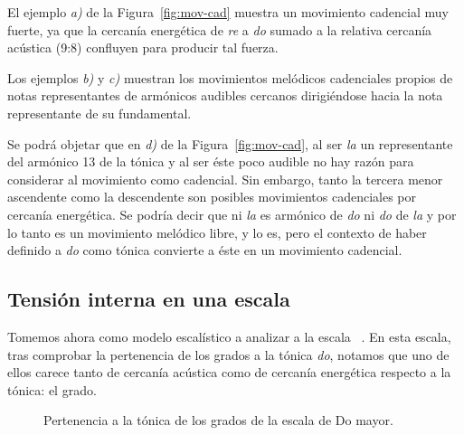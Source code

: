 \documentclass[a4paper,11pt]{article}
\begin{document}
\begin{multicols}{2}
  El ejemplo \emph{a)} de la Figura~\ref{fig:mov-cad} muestra un movimiento cadencial muy fuerte, ya que la cercanía energética de \emph{re} a \emph{do} sumado a la relativa cercanía acústica (9:8) confluyen para producir tal fuerza.

  Los ejemplos \emph{b)} y \emph{c)} muestran los movimientos melódicos cadenciales propios de notas representantes de armónicos audibles cercanos dirigiéndose hacia la nota representante de su fundamental.

  Se podrá objetar que en \emph{d)} de la Figura~\ref{fig:mov-cad}, al ser \emph{la} un representante del armónico 13 de la tónica y al ser éste poco audible no hay razón para considerar al movimiento  como cadencial. Sin embargo, tanto la tercera menor ascendente como la descendente son posibles movimientos cadenciales por cercanía energética. Se podría decir que ni \emph{la} es armónico de \emph{do} ni \emph{do} de \emph{la} y por lo tanto es un movimiento melódico libre, y lo es, pero el contexto de haber definido a \emph{do} como tónica convierte a éste en un movimiento cadencial.

    \subsection{Tensión interna en una escala}\label{subsec:tension}

    Tomemos ahora como modelo escalístico a analizar a la escala \hbox{ .} En esta escala, tras comprobar la pertenencia de los grados a la tónica \emph{do}, notamos que uno de ellos carece tanto de cercanía acústica como de cercanía energética respecto a la tónica: el  grado.
\end{multicols}

\begin{figure}[ht]
\centering
{}
\caption{Pertenencia a la tónica de los grados de la escala de Do mayor. }\label{fig:pertenencia-do}
\end{figure}
\end{document}
